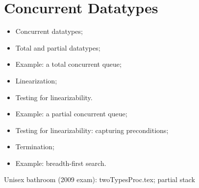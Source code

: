 \chapter{Concurrent Datatypes}
\label{chap:datatypes}




\begin{slide}

\begin{itemize}
\item 
Concurrent datatypes;

\item
Total and partial datatypes;

\item Example: a total concurrent queue;

\item
Linearization; 

\item Testing for linearizability.

\item 
Example: a partial concurrent queue;

\item
Testing for linearizability: capturing preconditions;

\item 
Termination;

\item Example: breadth-first search.

\end{itemize}
\end{slide}


\exercises


Unisex bathroom (2009 exam): twoTypesProc.tex; 
partial stack
